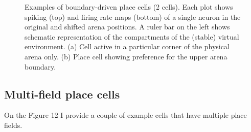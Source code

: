 \begin{figure}
\captionsetup{format=plain}
\caption[Self-motion or boundary-driven place cells]{
Examples of boundary-driven place cells (2 cells). Each plot shows spiking (top) and firing rate maps (bottom) of a single neuron in the original and shifted arena positions. A ruler bar on the left shows schematic representation of the compartments of the (stable) virtual environment. (a) Cell active in a particular corner of the physical arena only. (b) Place cell showing preference for the upper arena boundary.
}
\label{fig:F11_MPCs}
\end{figure}


\subsection{Multi-field place cells}

On the Figure 12 I provide a couple of example cells that have multiple place fields.

